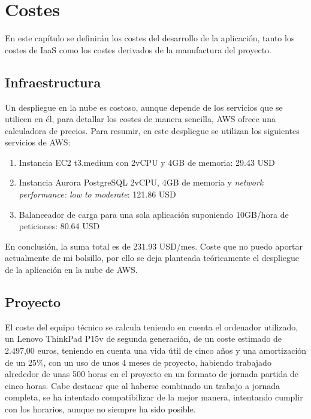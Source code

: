 \chapter{Costes}
En este capítulo se definirán los costes del desarrollo de la aplicación, tanto los costes de IaaS como los costes derivados de la manufactura del proyecto.

\section{Infraestructura}
Un despliegue en la nube es costoso, aunque depende de los servicios que se utilicen en él, para detallar los costes de manera sencilla, AWS ofrece una calculadora de precios. Para resumir, en este despliegue se utilizan los siguientes servicios de AWS:
\begin{enumerate}
    \item Instancia EC2 t3.medium con 2vCPU y 4GB de memoria: 29.43 USD
    \item Instancia Aurora PostgreSQL 2vCPU, 4GB de memoria y \emph{network performance: low to moderate}: 121.86 USD
    \item Balanceador de carga para una sola aplicación suponiendo 10GB/hora de peticiones: 80.64 USD
\end{enumerate}

En conclusión, la suma total es de 231.93 USD/mes. Coste que no puedo aportar actualmente de mi bolsillo, por ello se deja planteada teóricamente el despliegue de la aplicación en la nube de AWS.

\section{Proyecto}
El coste del equipo técnico se calcula teniendo en cuenta el ordenador utilizado, un Lenovo ThinkPad P15v de segunda generación, de un coste estimado de 2.497,00 euros, teniendo en cuenta una vida útil de cinco años y una amortización de un 25\%, con un uso de unos 4 meses de proyecto, habiendo trabajado alrededor de unas 500 horas en el proyecto en un formato de jornada partida de cinco horas. Cabe destacar que al haberse combinado un trabajo a jornada completa, se ha intentado compatibilizar de la mejor manera, intentando cumplir con los horarios, aunque no siempre ha sido posible.

